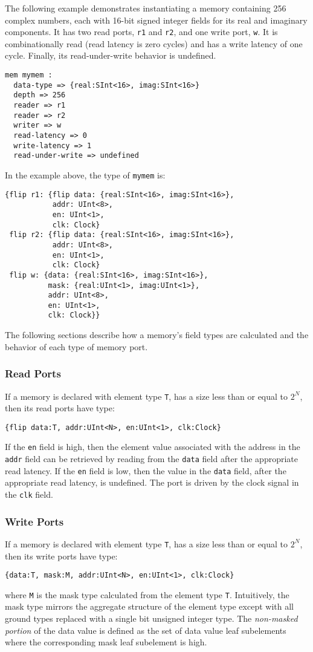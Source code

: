 \documentclass[12pt]{article}
\begin{document}
The following example demonstrates instantiating a memory containing 256 complex numbers, each with 16-bit signed integer fields for its real and imaginary components. It has two read ports, \verb|r1| and \verb|r2|, and one write port, \verb|w|. It is combinationally read (read latency is zero cycles) and has a write latency of one cycle. Finally, its read-under-write behavior is undefined.
\begin{lstlisting}
mem mymem :
  data-type => {real:SInt<16>, imag:SInt<16>}
  depth => 256
  reader => r1
  reader => r2
  writer => w
  read-latency => 0
  write-latency => 1
  read-under-write => undefined
\end{lstlisting}

In the example above, the type of \verb|mymem| is:
\begin{lstlisting}
{flip r1: {flip data: {real:SInt<16>, imag:SInt<16>}, 
           addr: UInt<8>, 
           en: UInt<1>, 
           clk: Clock}
 flip r2: {flip data: {real:SInt<16>, imag:SInt<16>}, 
           addr: UInt<8>, 
           en: UInt<1>, 
           clk: Clock}
 flip w: {data: {real:SInt<16>, imag:SInt<16>}, 
          mask: {real:UInt<1>, imag:UInt<1>}, 
          addr: UInt<8>, 
          en: UInt<1>, 
          clk: Clock}}
\end{lstlisting}

The following sections describe how a memory's field types are calculated and the behavior of each type of memory port.

\subsubsection{Read Ports}
If a memory is declared with element type \verb|T|, has a size less than or equal to $2^N$, then its read ports have type:
\begin{lstlisting}
{flip data:T, addr:UInt<N>, en:UInt<1>, clk:Clock}
\end{lstlisting}

If the \verb|en| field is high, then the element value associated with the address in the \verb|addr| field can be retrieved by reading from the \verb|data| field after the appropriate read latency. If the \verb|en| field is low, then the value in the \verb|data| field, after the appropriate read latency, is undefined. The port is driven by the clock signal in the \verb|clk| field.

\subsubsection{Write Ports}
If a memory is declared with element type \verb|T|, has a size less than or equal to $2^N$, then its write ports have type:
\begin{lstlisting}
{data:T, mask:M, addr:UInt<N>, en:UInt<1>, clk:Clock}
\end{lstlisting}
where \verb|M| is the mask type calculated from the element type \verb|T|. Intuitively, the mask type mirrors the aggregate structure of the element type except with all ground types replaced with a single bit unsigned integer type. The {\em non-masked portion} of the data value is defined as the set of data value leaf subelements where the corresponding mask leaf subelement is high.
\end{document}
